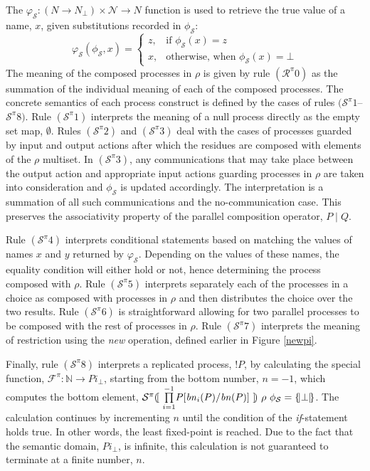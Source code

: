 \documentclass[10pt,a4paper,final,oneside,fleqn]{book}
\begin{document}
The $\varphi_\mathcal{S}:(N\to N_\bot)\times\mathcal{N}\to N$ function is used to retrieve the true value of a name, $x$, given substitutions recorded in $\phi_\mathcal{S}$:
\[\varphi_\mathcal{S}(\phi_\mathcal{S},x)=\left\{\begin{array}{ll}z,&\mbox{if }\phi_\mathcal{S}(x)=z\\
x,&\mbox{otherwise, when }\phi_\mathcal{S}(x)=\bot\end{array}\right.\]
The meaning of the composed processes in $\rho$ is given by rule $(\mathcal{R}^\pi 0)$ as the summation of the individual meaning of each of the composed processes.  The concrete semantics of each process construct is defined by the cases of rules $(\mathcal{S}^\pi 1$--$\mathcal{S}^\pi 8)$.  Rule $(\mathcal{S}^\pi 1)$ interprets the meaning of a null process directly as the empty set map, $\emptyset$.  Rules $(\mathcal{S}^\pi 2)$ and $(\mathcal{S}^\pi 3)$ deal with the cases of processes guarded by input and output actions after which the residues are composed with elements of the $\rho$ multiset.  In $(\mathcal{S}^\pi 3)$, any communications that may take place between the output action and appropriate input actions guarding processes in $\rho$ are taken into consideration and $\phi_\mathcal{S}$ is updated accordingly.  The interpretation is a summation of all such communications and the no-communication case. This preserves the associativity property of the parallel composition operator, $P\mid Q$.

Rule $(\mathcal{S}^\pi 4)$ interprets conditional statements based on matching the values of names $x$ and $y$ returned by $\varphi_\mathcal{S}$.  Depending on the values of these names, the equality condition will either hold or not, hence determining the process composed with $\rho$.  Rule $(\mathcal{S}^\pi 5)$ interprets separately each of the processes in a choice as composed with processes in $\rho$ and then distributes the choice over the two results.  Rule $(\mathcal{S}^\pi 6)$ is straightforward allowing for two parallel processes to be composed with the rest of processes in $\rho$. Rule $(\mathcal{S}^\pi 7)$ interprets the meaning of restriction using the {\itshape new\/} operation, defined earlier in Figure \ref{newpi}.

Finally, rule $(\mathcal{S}^\pi 8)$ interprets a replicated process, $!P$, by calculating the special function, $\mathcal{F}^\pi:\mathbb{N}\to Pi_\bot$, starting from the bottom number, $n=-1$, which computes the bottom element, $\mathcal{S}^\pi(\![~\underset{i=1}{\overset{-1}{\prod}}P[\mbox{{\itshape bn\/}}_i(P)/\mbox{{\itshape bn\/}}(P)]~]\!)~\rho~\phi_\mathcal{S}=\{\!|\bot|\!\}$.  The calculation continues by incrementing $n$ until the condition of the {\itshape if\/}-statement holds true. In other words, the least fixed-point is reached. Due to the fact that the semantic domain, $Pi_\bot$, is infinite, this calculation is not guaranteed to terminate at a finite number, $n$.
\end{document}
